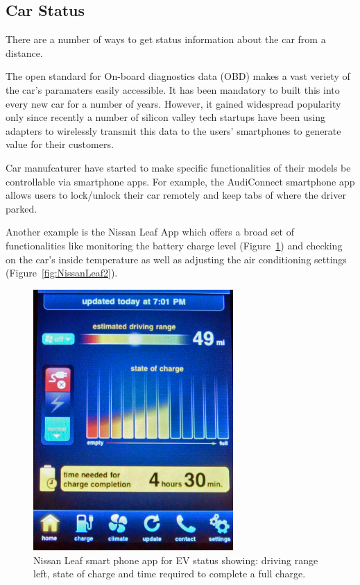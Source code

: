 \subsection{Car Status}
There are a number of ways to get status information about the car from a distance.

The open standard for On-board diagnostics data (OBD) makes a vast veriety of the car's paramaters easily accessible. It has been mandatory to built this into every new car for a number of years. However, it gained widespread popularity only since recently a number of silicon valley tech startups have been using adapters to wirelessly transmit this data to the users' smartphones to generate value for their customers. 

Car manufcaturer have started to make specific functionalities of their models be controllable via smartphone apps. For example, the AudiConnect smartphone app allows users to lock/unlock their car remotely and keep tabs of where the driver parked.

Another example is the Nissan Leaf App which offers a broad set of functionalities like monitoring the battery charge level (Figure~\ref{fig:NissanLeaf1}) and checking on the car's inside temperature as well as adjusting the air conditioning settings (Figure~\ref{fig:NissanLeaf2}).

\begin{figure}[h]
\centering
	\includegraphics[keepaspectratio, width=3in]{Figures/Nissan_Leaf_mobile_app_battery_status_1733.jpg}
	\caption{Nissan Leaf smart phone app for EV status showing: driving range left, state of charge and time required to complete a full charge.\protect\footnotemark}
	\label{fig:NissanLeaf1}
\end{figure}

